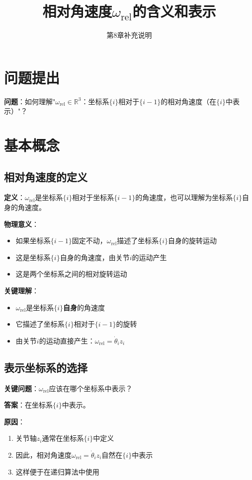 \documentclass[12pt,a4paper]{article}
\title{相对角速度$\omega_{\text{rel}}$的含义和表示}
\author{第8章补充说明}
\date{}
\begin{document}
\maketitle

\section{问题提出}

\textbf{问题}：如何理解"$\omega_{\text{rel}} \in \mathbb{R}^3$：坐标系$\{i\}$相对于$\{i-1\}$的相对角速度（在$\{i\}$中表示）"？

\section{基本概念}

\subsection{相对角速度的定义}

\textbf{定义}：$\omega_{\text{rel}}$是坐标系$\{i\}$相对于坐标系$\{i-1\}$的角速度，也可以理解为坐标系$\{i\}$自身的角速度。

\textbf{物理意义}：
\begin{itemize}
\item 如果坐标系$\{i-1\}$固定不动，$\omega_{\text{rel}}$描述了坐标系$\{i\}$自身的旋转运动
\item 这是坐标系$\{i\}$自身的角速度，由关节$i$的运动产生
\item 这是两个坐标系之间的相对旋转运动
\end{itemize}

\textbf{关键理解}：
\begin{itemize}
\item $\omega_{\text{rel}}$是坐标系$\{i\}$\textbf{自身}的角速度
\item 它描述了坐标系$\{i\}$相对于$\{i-1\}$的旋转
\item 由关节$i$的运动直接产生：$\omega_{\text{rel}} = \dot{\theta}_i z_i$
\end{itemize}

\subsection{表示坐标系的选择}

\textbf{关键问题}：$\omega_{\text{rel}}$应该在哪个坐标系中表示？

\textbf{答案}：在坐标系$\{i\}$中表示。

\textbf{原因}：
\begin{enumerate}
\item 关节轴$z_i$通常在坐标系$\{i\}$中定义
\item 因此，相对角速度$\omega_{\text{rel}} = \dot{\theta}_i z_i$自然在$\{i\}$中表示
\item 这样便于在递归算法中使用
\end{enumerate}
\end{document}
